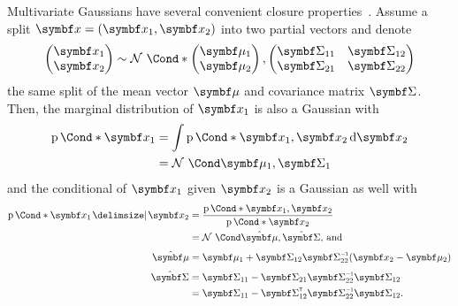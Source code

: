 Multivariate Gaussians have several convenient closure properties~\parencite{astrom_introduction_1971}.
Assume a split $\mat{x} = (\mat{x}_1, \mat{x}_2)$ into two partial vectors and denote
\begin{align}
    \begin{split}
        \begin{pmatrix}
            \mat{x}_1 \\
            \mat{x}_2
        \end{pmatrix}
        \sim \Gaussian*{
            \begin{pmatrix}
                \mat{\mu}_1 \\
                \mat{\mu}_2
            \end{pmatrix},
            \begin{pmatrix}
                \mat{\Sigma}_{11} & \mat{\Sigma}_{12} \\
                \mat{\Sigma}_{21} & \mat{\Sigma}_{22}
            \end{pmatrix}
        }
    \end{split}
\end{align}
the same split of the mean vector $\mat{\mu}$ and covariance matrix $\mat{\Sigma}$.
Then, the marginal distribution of $\mat{x}_1$ is also a Gaussian with
\begin{align}
    \begin{split}
        \label{eq:gaussian_marginal}
        \Prob*{\mat{x}_1}
        &= \int \Prob*{\mat{x}_1, \mat{x}_2} \diff \mat{x}_2 \\
        &= \Gaussian{\mat{\mu}_1, \mat{\Sigma}_1}
    \end{split}
\end{align}
and the conditional of $\mat{x}_1$ given $\mat{x}_2$ is a Gaussian as well with
\begin{align}
    \begin{split}
        \label{eq:gaussian_conditional}
        \Prob*{\mat{x}_1 \given \mat{x}_2}
        &= \frac{\Prob*{\mat{x}_1, \mat{x}_2}}{\Prob*{\mat{x}_2}} \\
        &= \Gaussian{\hat{\mat{\mu}}, \hat{\mat{\Sigma}}}\text{, and} \\[\smallskipamount]
        \hat{\mat{\mu}}
        &= \mat{\mu}_1 + \mat{\Sigma}_{12}\mat{\Sigma}\inv_{22} (\mat{x}_2 - \mat{\mu}_2) \\[\smallskipamount]
        \hat{\mat{\Sigma}}
        &= \mat{\Sigma}_{11} - \mat{\Sigma}_{21} \mat{\Sigma}\inv_{22} \mat{\Sigma}_{12} \\
        &= \mat{\Sigma}_{11} - \mat{\Sigma}\tran_{12} \mat{\Sigma}\inv_{22} \mat{\Sigma}_{12}.
    \end{split}
\end{align}

